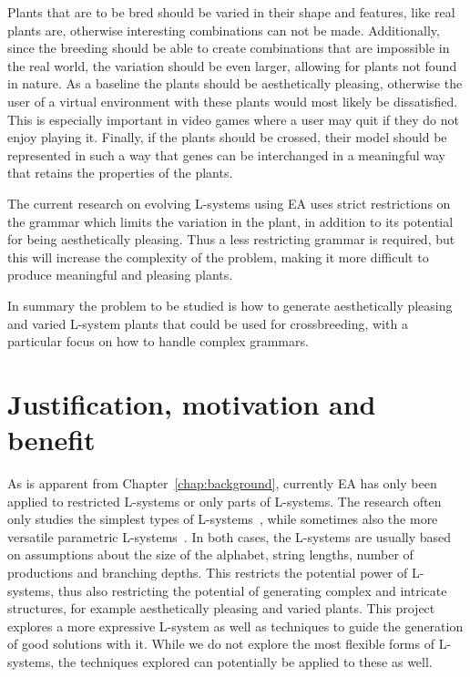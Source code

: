 Plants that are to be bred should be varied in their shape and features, like real plants are, otherwise interesting combinations can not be made.
Additionally, since the breeding should be able to create combinations that are impossible in the real world, the variation should be even larger, allowing for plants not found in nature.
As a baseline the plants should be aesthetically pleasing, otherwise the user of a virtual environment with these plants would most likely be dissatisfied.
This is especially important in video games where a user may quit if they do not enjoy playing it.
Finally, if the plants should be crossed, their model should be represented in such a way that genes can be interchanged in a meaningful way that retains the properties of the plants.

The current research on evolving \glspl{L-system} using \gls{EA} uses strict restrictions on the grammar which limits the variation in the plant, in addition to its potential for being aesthetically pleasing. %
Thus a less restricting grammar is required, but this will increase the complexity of the problem, making it more difficult to produce meaningful and pleasing plants.

In summary the problem to be studied is how to generate aesthetically pleasing and varied \gls{L-system} plants that could be used for crossbreeding, with a particular focus on how to handle complex grammars.

\section{Justification, motivation and benefit}
As is apparent from Chapter~\ref{chap:background}, currently \gls{EA} has only been applied to restricted L-systems or only parts of L-systems.
The research often only studies the simplest types of L-systems~\cite{1998Mock,1998Ochoa,2002Ebner,2003Ebner,2006Ashlock,2009Beaumont,2009Corchado}, while sometimes also the more versatile parametric L-systems~\cite{1994Jacob,2000Vanak,2001Hornby}.
In both cases, the L-systems are usually based on assumptions about the size of the alphabet, string lengths, number of productions and branching depths.
This restricts the potential power of L-systems, thus also restricting the potential of generating complex and intricate structures, for example aesthetically pleasing and varied plants.
This project explores a more expressive L-system as well as techniques to guide the generation of good solutions with it.
While we do not explore the most flexible forms of L-systems, the techniques explored can potentially be applied to these as well.

